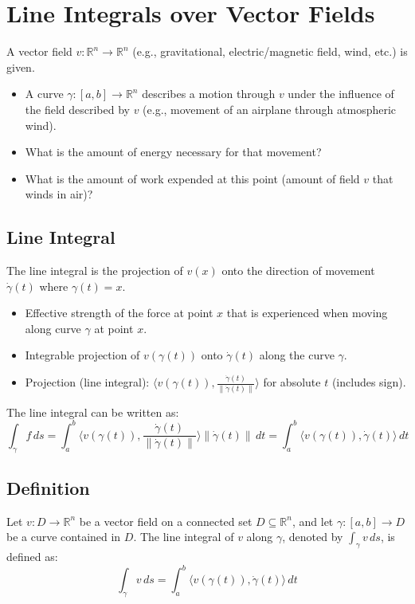 \documentclass{article}
\begin{document}
\section{Line Integrals over Vector Fields}
A vector field \( v: \mathbb{R}^n \to \mathbb{R}^n \) (e.g., gravitational, electric/magnetic field, wind, etc.) is given.

\begin{itemize}
    \item A curve \( \gamma: [a, b] \to \mathbb{R}^n \) describes a motion through \( v \) under the influence of the field described by \( v \) (e.g., movement of an airplane through atmospheric wind).
    \item What is the amount of energy necessary for that movement?
    \item What is the amount of work expended at this point (amount of field \( v \) that winds in air)?
\end{itemize}

\subsection{Line Integral}
The line integral is the projection of \( v(x) \) onto the direction of movement \( \dot{\gamma}(t) \) where \( \gamma(t) = x \).

\begin{itemize}
    \item Effective strength of the force at point \( x \) that is experienced when moving along curve \( \gamma \) at point \( x \).
    \item Integrable projection of \( v(\gamma(t)) \) onto \( \dot{\gamma}(t) \) along the curve \( \gamma \).
    \item Projection (line integral): \( \langle v(\gamma(t)), \frac{\dot{\gamma}(t)}{\|\dot{\gamma}(t)\|} \rangle \) for absolute \( t \) (includes sign).
\end{itemize}

The line integral can be written as:
\[
\int_{\gamma} f \, ds = \int_{a}^{b} \langle v(\gamma(t)), \frac{\dot{\gamma}(t)}{\|\dot{\gamma}(t)\|} \rangle \|\dot{\gamma}(t)\| \, dt = \int_{a}^{b} \langle v(\gamma(t)), \dot{\gamma}(t) \rangle \, dt
\]

\subsection*{Definition}
Let \( v: D \to \mathbb{R}^n \) be a vector field on a connected set \( D \subseteq \mathbb{R}^n \), and let \( \gamma: [a, b] \to D \) be a curve contained in \( D \). The line integral of \( v \) along \( \gamma \), denoted by \( \int_{\gamma} v \, ds \), is defined as:
\[
\int_{\gamma} v \, ds = \int_{a}^{b} \langle v(\gamma(t)), \dot{\gamma}(t) \rangle \, dt
\]
\end{document}
